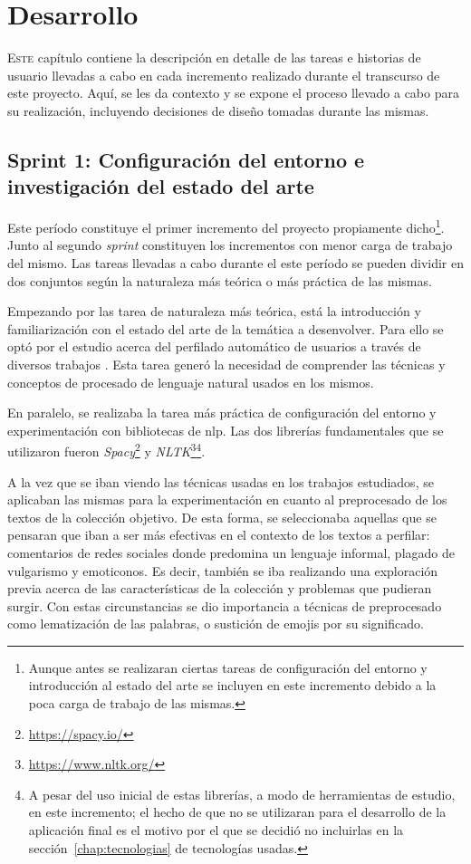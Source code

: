 \chapter{Desarrollo}
\label{chap:desarrollo}
\lettrine{E}{ste} capítulo contiene la descripción en detalle de las tareas e historias de usuario llevadas a cabo en cada incremento realizado durante el transcurso de este proyecto. Aquí, se les da contexto y se expone el proceso llevado a cabo para su realización, incluyendo decisiones de diseño tomadas durante las mismas.

\section{Sprint 1: Configuración del entorno e investigación del estado del arte}
Este período constituye el primer incremento del proyecto propiamente dicho\footnote{Aunque antes se realizaran ciertas tareas de configuración del entorno y introducción al estado del arte se incluyen en este incremento debido a la poca carga de trabajo de las mismas.}. Junto al segundo \textit{sprint} constituyen los incrementos con menor carga de trabajo del mismo. Las tareas llevadas a cabo durante el este período se pueden dividir en dos conjuntos según la naturaleza más teórica o más práctica de las mismas.

Empezando por las tarea de naturaleza más teórica, está la introducción y familiarización con el estado del arte de la temática a desenvolver. Para ello se optó por el estudio acerca del perfilado automático de usuarios a través de diversos trabajos \citep{profiling_urdu, radivchev2019celebrity, pronouns_paper}. Esta tarea generó la necesidad de comprender las técnicas y conceptos de procesado de lenguaje natural usados en los mismos.

En paralelo, se realizaba la tarea más práctica de configuración del entorno y experimentación con bibliotecas de \acrshort{nlp}. Las dos librerías fundamentales que se utilizaron fueron \textit{Spacy}\footnote{\url{https://spacy.io/}} y \textit{NLTK}\footnote{\url{https://www.nltk.org/}}\footnote{A pesar del uso inicial de estas librerías, a modo de herramientas de estudio, en este incremento; el hecho de que no se utilizaran para el desarrollo de la aplicación final es el motivo por el que se decidió no incluirlas en la sección~\ref{chap:tecnologias} de tecnologías usadas.}.

A la vez que se iban viendo las técnicas usadas en los trabajos estudiados, se aplicaban las mismas para la experimentación en cuanto al preprocesado de los textos de la colección objetivo. De esta forma, se seleccionaba aquellas que se pensaran que iban a ser más efectivas en el contexto de los textos a perfilar: comentarios de redes sociales donde predomina un lenguaje informal, plagado de vulgarismo y emoticonos. Es decir, también se iba realizando una exploración previa acerca de las características de la colección y problemas que pudieran surgir. Con estas circunstancias se dio importancia a técnicas de preprocesado como lematización de las palabras, o sustición de emojis por su significado. 

